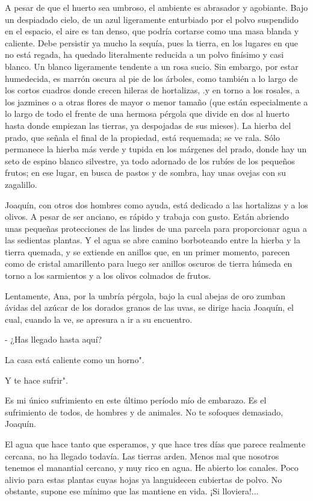 \documentclass[12pt]{book} %
\begin{document}
A pesar de que el huerto sea umbroso, el ambiente es abrasador y agobiante. Bajo un despiadado cielo, de un azul ligeramente enturbiado por el polvo suspendido en el espacio, el aire es tan denso, que podría cortarse como una masa blanda y caliente. Debe persistir ya mucho la sequía, pues la tierra, en los lugares en que no está regada, ha quedado literalmente reducida a un polvo finísimo y casi blanco. Un blanco ligeramente tendente a un rosa sucio. Sin embargo, por estar humedecida, es marrón oscura al pie de los árboles, como también a lo largo de los cortos cuadros donde crecen hileras de hortalizas, .y en torno a los rosales, a los jazmines o a otras flores de mayor o menor tamaño (que están especialmente a lo largo de todo el frente de una hermosa pérgola que divide en dos al huerto hasta donde empiezan las tierras, ya despojadas de sus mieses). La hierba del prado, que señala el final de la propiedad, está requemada; se ve rala. Sólo permanece la hierba más verde y tupida en los márgenes del prado, donde hay un seto de espino blanco silvestre, ya todo adornado de los rubíes de los pequeños frutos; en ese lugar, en busca de pastos y de sombra, hay unas ovejas con su zagalillo. 

Joaquín, con otros dos hombres como ayuda, está dedicado a las hortalizas y a los olivos. A pesar de ser anciano, es rápido y trabaja con gusto. Están abriendo unas pequeñas protecciones de las lindes de una parcela para proporcionar agua a las sedientas plantas. Y el agua se abre camino borboteando entre la hierba y la tierra quemada, y se extiende en anillos que, en un primer momento, parecen como de cristal amarillento para luego ser anillos oscuros de tierra húmeda en torno a los sarmientos y a los olivos colmados de frutos. 

Lentamente, Ana, por la umbría pérgola, bajo la cual abejas de oro zumban ávidas del azúcar de los dorados granos de las uvas, se dirige hacia Joaquín, el cual, cuando la ve, se apresura a ir a su encuentro. 

- ¿Has llegado hasta aquí? 

La casa está caliente como un horno". 

Y te hace sufrir". 

Es mi único sufrimiento en este último período mío de embarazo. Es el sufrimiento de todos, de hombres y de animales. No te sofoques demasiado, Joaquín. 

El agua que hace tanto que esperamos, y que hace tres días que parece realmente cercana, no ha llegado todavía. Las tierras arden. Menos mal que nosotros tenemos el manantial cercano, y muy rico en agua. He abierto los canales. Poco alivio para estas plantas cuyas hojas ya languidecen cubiertas de polvo. No obstante, supone ese mínimo que las mantiene en vida. ¡Si lloviera!... 
\end{document}
